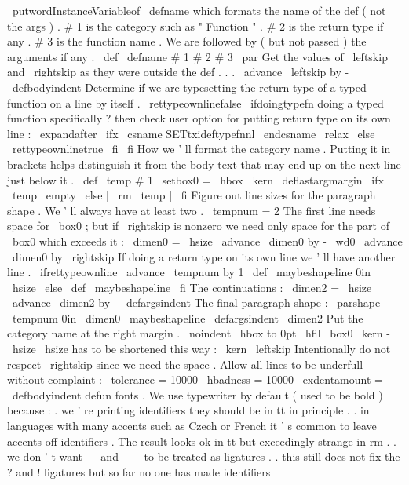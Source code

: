 {{{{{\
putwordInstanceVariableof
}
%
\
defname
which
formats
the
name
of
the
def
(
not
the
args
)
.
%
#
1
is
the
category
such
as
"
Function
"
.
%
#
2
is
the
return
type
if
any
.
%
#
3
is
the
function
name
.
%
%
We
are
followed
by
(
but
not
passed
)
the
arguments
if
any
.
%
\
def
\
defname
#
1
#
2
#
3
{
%
\
par
%
Get
the
values
of
\
leftskip
and
\
rightskip
as
they
were
outside
the
def
.
.
.
\
advance
\
leftskip
by
-
\
defbodyindent
%
%
Determine
if
we
are
typesetting
the
return
type
of
a
typed
function
%
on
a
line
by
itself
.
\
rettypeownlinefalse
\
ifdoingtypefn
%
doing
a
typed
function
specifically
?
%
then
check
user
option
for
putting
return
type
on
its
own
line
:
\
expandafter
\
ifx
\
csname
SETtxideftypefnnl
\
endcsname
\
relax
\
else
\
rettypeownlinetrue
\
fi
\
fi
%
%
How
we
'
ll
format
the
category
name
.
Putting
it
in
brackets
helps
%
distinguish
it
from
the
body
text
that
may
end
up
on
the
next
line
%
just
below
it
.
\
def
\
temp
{
#
1
}
%
\
setbox0
=
\
hbox
{
\
kern
\
deflastargmargin
\
ifx
\
temp
\
empty
\
else
[
\
rm
\
temp
]
\
fi
}
%
%
Figure
out
line
sizes
for
the
paragraph
shape
.
We
'
ll
always
have
at
%
least
two
.
\
tempnum
=
2
%
%
The
first
line
needs
space
for
\
box0
;
but
if
\
rightskip
is
nonzero
%
we
need
only
space
for
the
part
of
\
box0
which
exceeds
it
:
\
dimen0
=
\
hsize
\
advance
\
dimen0
by
-
\
wd0
\
advance
\
dimen0
by
\
rightskip
%
%
If
doing
a
return
type
on
its
own
line
we
'
ll
have
another
line
.
\
ifrettypeownline
\
advance
\
tempnum
by
1
\
def
\
maybeshapeline
{
0in
\
hsize
}
%
\
else
\
def
\
maybeshapeline
{
}
%
\
fi
%
%
The
continuations
:
\
dimen2
=
\
hsize
\
advance
\
dimen2
by
-
\
defargsindent
%
%
The
final
paragraph
shape
:
\
parshape
\
tempnum
0in
\
dimen0
\
maybeshapeline
\
defargsindent
\
dimen2
%
%
Put
the
category
name
at
the
right
margin
.
\
noindent
\
hbox
to
0pt
{
%
\
hfil
\
box0
\
kern
-
\
hsize
%
\
hsize
has
to
be
shortened
this
way
:
\
kern
\
leftskip
%
Intentionally
do
not
respect
\
rightskip
since
we
need
the
space
.
}
%
%
%
Allow
all
lines
to
be
underfull
without
complaint
:
\
tolerance
=
10000
\
hbadness
=
10000
\
exdentamount
=
\
defbodyindent
{
%
%
defun
fonts
.
We
use
typewriter
by
default
(
used
to
be
bold
)
because
:
%
.
we
'
re
printing
identifiers
they
should
be
in
tt
in
principle
.
%
.
in
languages
with
many
accents
such
as
Czech
or
French
it
'
s
%
common
to
leave
accents
off
identifiers
.
The
result
looks
ok
in
%
tt
but
exceedingly
strange
in
rm
.
%
.
we
don
'
t
want
-
-
and
-
-
-
to
be
treated
as
ligatures
.
%
.
this
still
does
not
fix
the
?
and
!
ligatures
but
so
far
no
%
one
has
made
identifiers
}}}}}}
